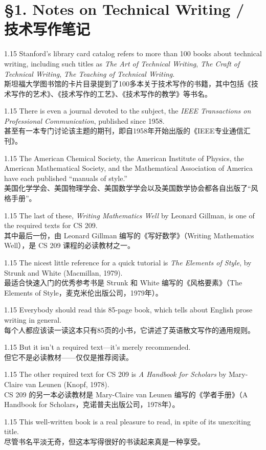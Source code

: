 \documentclass[12pt,a4paper]{article}
\newcommand{\bilingual}[2]{
    \begin{spacing}{1.15} %
        \noindent \normalsize #1 \\[-0.5ex] %
        \small \textcolor{blue!70!black}{#2} %
    \end{spacing}
    \vspace{0.8em} %
}
\begin{document}
\section*{\S 1. Notes on Technical Writing / 技术写作笔记}

\bilingual{Stanford's library card catalog refers to more than 100 books about technical writing, including such titles as \textit{The Art of Technical Writing}, \textit{The Craft of Technical Writing}, \textit{The Teaching of Technical Writing}.}{斯坦福大学图书馆的卡片目录提到了100多本关于技术写作的书籍，其中包括《技术写作的艺术》、《技术写作的工艺》、《技术写作的教学》等书名。}

\bilingual{There is even a journal devoted to the subject, the \textit{IEEE Transactions on Professional Communication}, published since 1958.}{甚至有一本专门讨论该主题的期刊，即自1958年开始出版的《IEEE专业通信汇刊》。}

\bilingual{The American Chemical Society, the American Institute of Physics, the American Mathematical Society, and the Mathematical Association of America have each published ``manuals of style.''}{美国化学学会、美国物理学会、美国数学学会以及美国数学协会都各自出版了“风格手册”。}

\bilingual{The last of these, \textit{Writing Mathematics Well} by Leonard Gillman, is one of the required texts for CS 209.}{其中最后一份，由 Leonard Gillman 编写的《写好数学》（Writing Mathematics Well），是 CS 209 课程的必读教材之一。}

\bilingual{The nicest little reference for a quick tutorial is \textit{The Elements of Style}, by Strunk and White (Macmillan, 1979).}{最适合快速入门的优秀参考书是 Strunk 和 White 编写的《风格要素》（The Elements of Style，麦克米伦出版公司，1979年）。}

\bilingual{Everybody should read this 85-page book, which tells about English prose writing in general.}{每个人都应该读一读这本只有85页的小书，它讲述了英语散文写作的通用规则。}

\bilingual{But it isn't a required text---it's merely recommended.}{但它不是必读教材——仅仅是推荐阅读。}

\bilingual{The other required text for CS 209 is \textit{A Handbook for Scholars} by Mary-Claire van Leunen (Knopf, 1978).}{CS 209 的另一本必读教材是 Mary-Claire van Leunen 编写的《学者手册》（A Handbook for Scholars，克诺普夫出版公司，1978年）。}

\bilingual{This well-written book is a real pleasure to read, in spite of its unexciting title.}{尽管书名平淡无奇，但这本写得很好的书读起来真是一种享受。}
\end{document}
